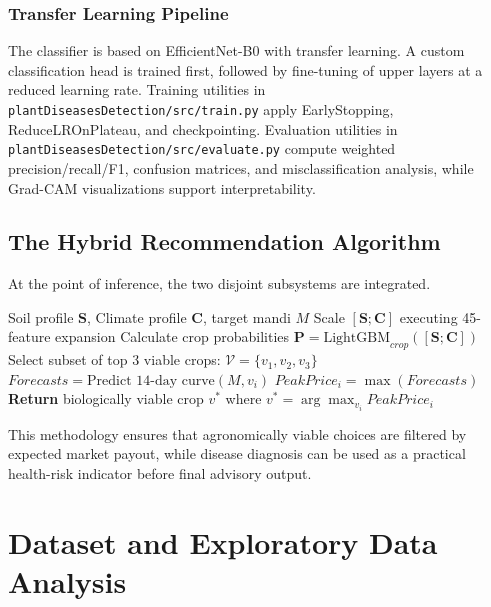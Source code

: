 \documentclass[conference]{IEEEtran}
\begin{document}
\subsubsection{Transfer Learning Pipeline}
The classifier is based on EfficientNet-B0 with transfer learning. A custom classification head is trained first, followed by fine-tuning of upper layers at a reduced learning rate. Training utilities in \texttt{plantDiseasesDetection/src/train.py} apply EarlyStopping, ReduceLROnPlateau, and checkpointing. Evaluation utilities in \texttt{plantDiseasesDetection/src/evaluate.py} compute weighted precision/recall/F1, confusion matrices, and misclassification analysis, while Grad-CAM visualizations support interpretability.

\subsection{The Hybrid Recommendation Algorithm}
At the point of inference, the two disjoint subsystems are integrated. 

\begin{algorithm}[H]
\caption{Hybrid Profit-Maximizing Recommender}
\begin{algorithmic}[1]
\REQUIRE Soil profile $\mathbf{S}$, Climate profile $\mathbf{C}$, target mandi $M$
\STATE Scale $[\mathbf{S}; \mathbf{C}]$ executing 45-feature expansion
\STATE Calculate crop probabilities $\mathbf{P} = \text{LightGBM}_{crop}([\mathbf{S}; \mathbf{C}])$
\STATE Select subset of top 3 viable crops: $\mathcal{V} = \{v_1, v_2, v_3\}$
    \STATE $Forecasts = \text{Predict 14-day curve}(M, v_i)$
    \STATE $PeakPrice_i = \max(Forecasts)$
\ENDFOR
\STATE \textbf{Return} biologically viable crop $v^*$ where $v^* = \arg\max_{v_i} PeakPrice_i$
\end{algorithmic}
\end{algorithm}

This methodology ensures that agronomically viable choices are filtered by expected market payout, while disease diagnosis can be used as a practical health-risk indicator before final advisory output.

\section{Dataset and Exploratory Data Analysis}
\end{document}
